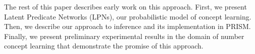 \documentclass[10pt, twocolumn]{article}
\begin{document}
The rest of this paper describes early work on this approach. First,
we present Latent Predicate Networks (LPNs), our probabilistic model
of concept learning. Then, we describe our approach to inference and
its implementation in PRISM. Finally, we present preliminary
experimental results in the domain of number concept learning that
demonstrate the promise of this approach.




\end{document}
